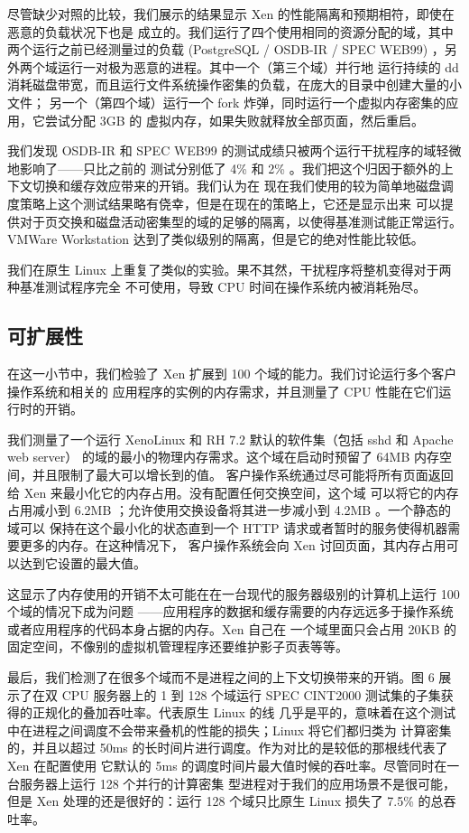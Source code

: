 尽管缺少对照的比较，我们展示的结果显示 Xen 的性能隔离和预期相符，即使在恶意的负载状况下也是
成立的。我们运行了四个使用相同的资源分配的域，其中两个运行之前已经测量过的负载 (PostgreSQL
/ OSDB-IR / SPEC WEB99) ，另外两个域运行一对极为恶意的进程。其中一个（第三个域）并行地
运行持续的 dd 消耗磁盘带宽，而且运行文件系统操作密集的负载，在庞大的目录中创建大量的小文件；
另一个（第四个域）运行一个 fork 炸弹，同时运行一个虚拟内存密集的应用，它尝试分配 3GB 的
虚拟内存，如果失败就释放全部页面，然后重启。

我们发现 OSDB-IR 和 SPEC WEB99 的测试成绩只被两个运行干扰程序的域轻微地影响了——只比之前的
测试分别低了 4\% 和 2\% 。我们把这个归因于额外的上下文切换和缓存效应带来的开销。我们认为在
现在我们使用的较为简单地磁盘调度策略上这个测试结果略有侥幸，但是在现在的策略上，它还是显示出来
可以提供对于页交换和磁盘活动密集型的域的足够的隔离，以使得基准测试能正常运行。
VMWare Workstation 达到了类似级别的隔离，但是它的绝对性能比较低。

我们在原生 Linux 上重复了类似的实验。果不其然，干扰程序将整机变得对于两种基准测试程序完全
不可使用，导致 CPU 时间在操作系统内被消耗殆尽。

\subsection{可扩展性}

在这一小节中，我们检验了 Xen 扩展到 100 个域的能力。我们讨论运行多个客户操作系统和相关的
应用程序的实例的内存需求，并且测量了 CPU 性能在它们运行时的开销。

我们测量了一个运行 XenoLinux 和 RH 7.2 默认的软件集（包括 sshd 和 Apache web server）
的域的最小的物理内存需求。这个域在启动时预留了 64MB 内存空间，并且限制了最大可以增长到的值。
客户操作系统通过尽可能将所有页面返回给 Xen 来最小化它的内存占用。没有配置任何交换空间，这个域
可以将它的内存占用减小到 6.2MB ；允许使用交换设备将其进一步减小到 4.2MB 。一个静态的域可以
保持在这个最小化的状态直到一个 HTTP 请求或者暂时的服务使得机器需要更多的内存。在这种情况下，
客户操作系统会向 Xen 讨回页面，其内存占用可以达到它设置的最大值。

这显示了内存使用的开销不太可能在在一台现代的服务器级别的计算机上运行 100 个域的情况下成为问题
——应用程序的数据和缓存需要的内存远远多于操作系统或者应用程序的代码本身占据的内存。Xen 自己在
一个域里面只会占用 20KB 的固定空间，不像别的虚拟机管理程序还要维护影子页表等等。

最后，我们检测了在很多个域而不是进程之间的上下文切换带来的开销。图 6 展示了在双 CPU 服务器上的
1 到 128 个域运行 SPEC CINT2000 测试集的子集获得的正规化的叠加吞吐率。代表原生 Linux 的线
几乎是平的，意味着在这个测试中在进程之间调度不会带来叠机的性能的损失；Linux 将它们都归类为
计算密集的，并且以超过 50ms 的长时间片进行调度。作为对比的是较低的那根线代表了 Xen 在配置使用
它默认的 5ms 的调度时间片最大值时候的吞吐率。尽管同时在一台服务器上运行 128 个并行的计算密集
型进程对于我们的应用场景不是很可能，但是 Xen 处理的还是很好的：运行 128 个域只比原生 Linux
损失了 7.5\% 的总吞吐率。

